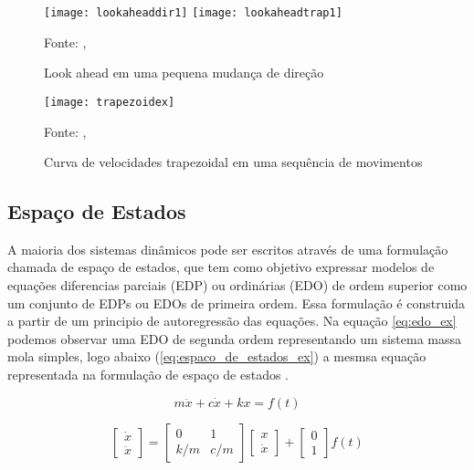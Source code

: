 \begin{figure}[!htb]
    \centering
    \caption{Look ahead em uma pequena mudança de direção}
    \texttt{[image: lookaheaddir1]}
    \texttt{[image: lookaheadtrap1]}

    {\footnotesize Fonte: \citeauthor{klipperkinematic}, \citeyear{klipperkinematic}}
    \label{fig:lookahead_small}
\end{figure}


\begin{figure}[!htb]
    \centering
    \caption{Curva de velocidades trapezoidal em uma sequência de movimentos}
    \texttt{[image: trapezoidex]}

    {\footnotesize Fonte: \citeauthor{klipperkinematic}, \citeyear{klipperkinematic}}
    \label{fig:trapezoidal}
\end{figure}


\subsection{Espaço de Estados}

A maioria dos sistemas dinâmicos pode ser escritos através de uma formulação
chamada de espaço de estados, que tem como objetivo expressar modelos 
de equações diferencias parciais (EDP) ou ordinárias (EDO) de ordem superior
como um conjunto de EDPs ou EDOs de primeira ordem.
Essa formulação é construida a partir de um principio de autoregressão
das equações. Na equação \ref{eq:edo_ex} podemos observar uma EDO de segunda ordem representando
um sistema massa mola simples,
logo abaixo (\ref{eq:espaco_de_estados_ex}) a mesmsa equação representada na formulação
de espaço de estados \cite{hamilton94}.

\begin{equation}
    \label{eq:edo_ex}
    m \ddot x+c \dot x+kx = f(t)
\end{equation}

\begin{equation}
    \label{eq:espaco_de_estados_ex}
    \begin{bmatrix}
        \dot x \\
        \ddot x
    \end{bmatrix}
    =
    \begin{bmatrix}
        0 & 1 \\
        k/m & c/m
    \end{bmatrix}
    \begin{bmatrix}
        x \\
        \dot x
    \end{bmatrix}
    +
    \begin{bmatrix}
        0 \\
        1
    \end{bmatrix}
    f(t)
\end{equation}

